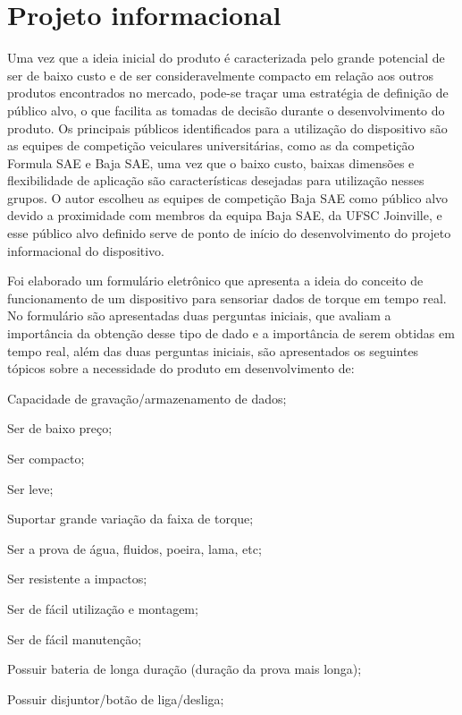 \section{Projeto informacional}

Uma vez que a ideia inicial do produto é caracterizada pelo grande potencial de ser de baixo custo e de ser consideravelmente compacto em relação aos outros produtos encontrados no
mercado, pode-se traçar uma estratégia de definição de público alvo, o que facilita as tomadas de decisão durante o desenvolvimento do produto.
Os principais públicos identificados para a utilização do dispositivo são as equipes de competição veiculares universitárias, como as da competição Formula SAE e Baja SAE,
uma vez que o baixo custo, baixas dimensões e flexibilidade de aplicação são características desejadas para utilização nesses grupos.
O autor escolheu as equipes de competição Baja SAE como público alvo devido a proximidade com membros da equipa Baja SAE, da UFSC Joinville, e esse público alvo definido serve de ponto
de início do desenvolvimento do projeto informacional do dispositivo.

Foi elaborado um formulário eletrônico que apresenta a ideia do conceito de funcionamento de um dispositivo para sensoriar dados de torque em tempo real.
No formulário são apresentadas duas perguntas iniciais, que avaliam a importância da obtenção desse tipo de dado e a importância de serem obtidas em tempo real, além das duas perguntas
iniciais, são apresentados os seguintes tópicos sobre a necessidade do produto em desenvolvimento de:

\begin{alineas}

	\item Capacidade de gravação/armazenamento de dados;
	\item Ser de baixo preço;
	\item Ser compacto;
	\item Ser leve;
	\item Suportar grande variação da faixa de torque;
	\item Ser a prova de água, fluidos, poeira, lama, etc;
	\item Ser resistente a impactos;
	\item Ser de fácil utilização e montagem;
	\item Ser de fácil manutenção;
	\item Possuir bateria de longa duração (duração da prova mais longa);
	\item Possuir disjuntor/botão de liga/desliga;

\end{alineas}

